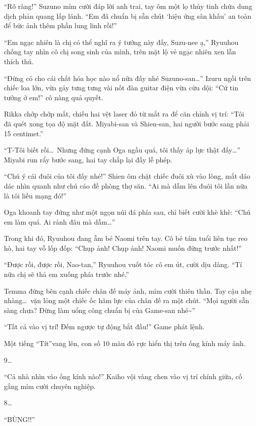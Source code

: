 \documentclass[../main.tex]{subfiles}
\begin{document}
``Rõ ràng!'' Suzuno mỉm cười đáp lời anh trai, tay ôm một lọ thủy tinh chứa dung dịch phản quang lấp lánh. ``Em đã chuẩn bị sẵn chút `hiệu ứng sân khấu' an toàn để bức ảnh thêm phần lung linh rồi!''

``Em ngạc nhiên là chị có thể nghĩ ra ý tưởng này đấy, Suzu-nee ạ,'' Ryuuhou chống tay nhìn cô chị song sinh của mình, trên mặt lộ vẻ ngạc nhiên xen lẫn thích thú.

``Đừng có cho cái chất hóa học nào nổ nữa đấy nhé Suzuno-san\dots'' Izuru ngồi trên chiếc loa lớn, vừa gảy tưng tưng vài nốt đàn guitar điện vừa cừu dội: ``Cứ tin tưởng ở em!'' cô nàng quả quyết.

Rikka chớp chớp mắt, chiếu hai vệt laser đỏ từ mắt ra để căn chỉnh vị trí: ``Tôi đã quét xong tọa độ mặt đất. Miyabi-san và Shien-san, hai người bước sang phải 15 centimet.''

``T-Tôi biết rồi\dots\ Nhưng đứng cạnh Oga ngầu quá, tôi thấy áp lực thật đấy\dots'' Miyabi run rẩy bước sang, hai tay chắp lại đầy lễ phép.

``Chú ý cái đuôi của tôi đấy nhé!'' Shien ôm chặt chiếc đuôi xù vào lòng, mắt dáo dác nhìn quanh như chú cáo đề phòng thợ săn. ``Ai mà dẫm lên đuôi tôi lần nữa là tôi liều mạng đó!''

Oga khoanh tay đứng như một ngọn núi đá phía sau, chỉ biết cười khè khè: ``Chú em làm quá. Ai rảnh đâu mà dẫm\dots''

Trong khi đó, Ryuuhou đang ẵm bé Naomi trên tay. Cô bé tám tuổi liên tục reo hò, hai tay vỗ lốp đốp: ``Chụp ảnh! Chụp ảnh! Naomi muốn đứng trước nhất!''

``Được rồi, được rồi, Nao-tan,'' Ryuuhou vuốt tóc cô em út, cười dịu dàng. ``Tí nữa chị sẽ thả em xuống phía trước nhé.''

Temma đứng bên cạnh chiếc chân đế máy ảnh, mỉm cười thiên thần. Tay cậu nhẹ nhàng\dots\ vặn lỏng một chiếc ốc hãm lực của chân đế ra một chút. ``Mọi người sẵn sàng chưa? Đừng làm uổng công chuẩn bị của Game-san nhé\~{}''

``Tất cả vào vị trí! Đếm ngược tự động bắt đầu!'' Game phát lệnh.

Một tiếng ``Tít''vang lên, con số 10 màu đỏ rực hiển thị trên ống kính máy ảnh.

9\dots

``Cả nhà nhìn vào ống kính nào!'' Kaiho vội vàng chen vào vị trí chính giữa, cố gắng mỉm cười chuyên nghiệp.

8\dots

``BÙNG!!''
\end{document}

